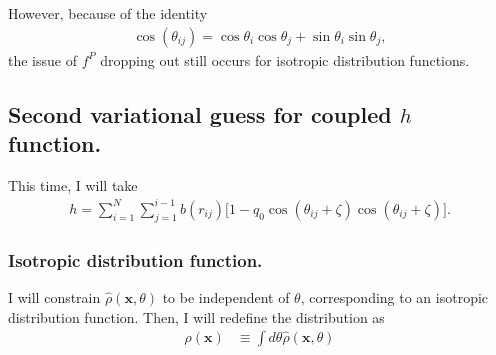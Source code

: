 \documentclass{article}
\begin{document}
However, because of the identity
\begin{align}
  \cos(\theta_{ij})=\cos\theta_i\cos\theta_j+\sin\theta_i\sin\theta_j,
\end{align}
the issue of $f^P$ dropping out still occurs for isotropic distribution functions.

\subsection{Second variational guess for coupled $h$ function.}

This time, I will take
\begin{align}
  h = \sum_{i=1}^N\sum_{j=1}^{i-1}b(r_{ij})
  \big[1-q_0\cos(\theta_{ij}+\zeta)\cos(\theta_{ij}+\zeta)\big].
\end{align}



\subsubsection{Isotropic distribution function.}

I will constrain $\hat{\rho}(\bm{x},\theta)$ to be independent of $\theta$, corresponding to
an isotropic distribution function. Then, I will redefine the distribution as
\begin{align}
  \rho(\bm{x})&\equiv\int d\theta\hat{\rho}(\bm{x},\theta)\nonumber\\
\end{align}
\end{document}
